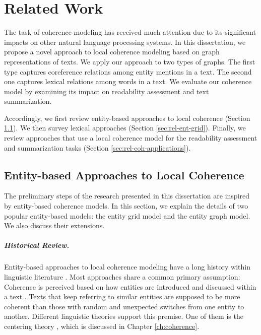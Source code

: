 
\chapter{Related Work}
\label{ch:rel-work}

The task of coherence modeling has received much attention due to its significant impacts on other natural language processing systems. 
In this dissertation, we propose a novel approach to local coherence modeling based on graph representations of texts. 
We apply our approach to two types of graphs.  
The first type captures coreference relations among entity mentions in a text. 
The second one captures lexical relations among words in a text.  
We evaluate our coherence model by examining its impact on readability assessment and text summarization. 

Accordingly, we first review entity-based approaches to local coherence (Section \ref{sec:rel-entity-models}). 
We then survey lexical approaches (Section \ref{sec:rel-ent-grid}). 
Finally, we review approaches that use a local coherence model for the readability assessment and summarization tasks (Section \ref{sec:rel-coh-applications}). 

\section{Entity-based Approaches to Local Coherence}
\label{sec:rel-entity-models}

The preliminary steps of the research presented in this dissertation are inspired by entity-based coherence models. 
In this section, we explain the details of two popular entity-based models: the entity grid model and the entity graph model. 
We also discuss their extensions.  

\paragraph{Historical Review.} 
Entity-based approaches to local coherence modeling have a long history within linguistic literature \cite{kuno72,halliday76,prince81a,joshi98}.
Most approaches share a common primary assumption: Coherence is perceived based on how entities are introduced and discussed within a text \cite{barzilay08}. 
Texts that keep referring to similar entities are supposed to be more coherent than those with random and unexpected switches from one entity to another. 
Different linguistic theories support this premise. 
One of them is the centering theory \cite{grosz95,joshi98}, which is discussed in Chapter \ref{ch:coherence}. 

